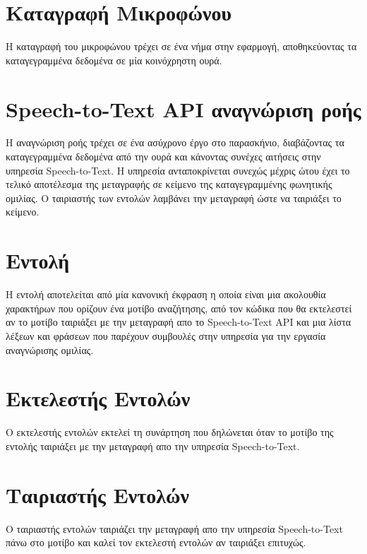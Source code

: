 \documentclass[oneside, 12pt]{book}
\begin{document}
\section{Καταγραφή Μικροφώνου}
Η καταγραφή του μικροφώνου τρέχει σε ένα νήμα στην εφαρμογή, αποθηκεύοντας τα καταγεγραμμένα δεδομένα σε μία κοινόχρηστη ουρά.
\section{Speech-to-Text API αναγνώριση ροής}
Η αναγνώριση ροής τρέχει σε ένα ασύχρονο έργο στο παρασκήνιο, διαβάζοντας τα καταγεγραμμένα δεδομένα από την ουρά και κάνοντας συνέχες αιτήσεις στην υπηρεσία Speech-to-Text. Η υπηρεσία ανταποκρίνεται συνεχώς μέχρις ώτου έχει το τελικό αποτέλεσμα της μεταγραφής σε κείμενο της καταγεγραμμένης φωνητικής ομιλίας. Ο ταιριαστής των εντολών λαμβάνει την μεταγραφή ώστε να ταιριάξει το κείμενο.
\section{Εντολή}
Η εντολή αποτελείται από μία κανονική έκφραση η οποία είναι μια ακολουθία χαρακτήρων που ορίζουν ένα μοτίβο αναζήτησης, από τον κώδικα που θα εκτελεστεί αν το μοτίβο ταιριάξει με την μεταγραφή απο το Speech-to-Text API και μια λίστα λέξεων και φράσεων που παρέχουν συμβουλές στην υπηρεσία για την εργασία αναγνώρισης ομιλίας.
\section{Εκτελεστής Εντολών}
Ο εκτελεστής εντολών εκτελεί τη συνάρτηση που δηλώνεται όταν το μοτίβο της εντολής ταιριάξει με την μεταγραφή απο την υπηρεσία Speech-to-Text.
\section{Ταιριαστής Εντολών}
Ο ταιριαστής εντολών ταιριάζει την μεταγραφή απο την υπηρεσία Speech-to-Text πάνω στο μοτίβο και καλεί τον εκτελεστή εντολών αν ταιριάξει επιτυχώς.


%
\end{document}
